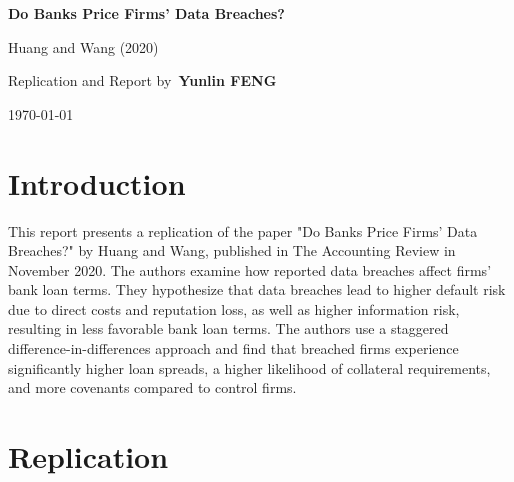 \documentclass[11pt]{article}
\begin{document}
\begin{titlepage}
  \begin{center}
    \vspace*{1cm}

    \Huge
    \textbf{Do Banks Price Firms' Data Breaches?}

    \vspace{0.5cm}
    \LARGE
    Huang and Wang (2020)

    \vspace{1.5cm}

    \vfill

    \vspace{0.8cm}

    \Large
    Replication and Report by\
    \textbf{Yunlin FENG}

    \vspace{0.8cm}

    \large
    \today

  \end{center}
\end{titlepage}

\section{Introduction}

This report presents a replication of the paper "Do Banks Price Firms' Data Breaches?" by Huang and Wang, published in The Accounting Review in November 2020. The authors examine how reported data breaches affect firms' bank loan terms. They hypothesize that data breaches lead to higher default risk due to direct costs and reputation loss, as well as higher information risk, resulting in less favorable bank loan terms. The authors use a staggered difference-in-differences approach and find that breached firms experience significantly higher loan spreads, a higher likelihood of collateral requirements, and more covenants compared to control firms.

\section{Replication}
\end{document}
